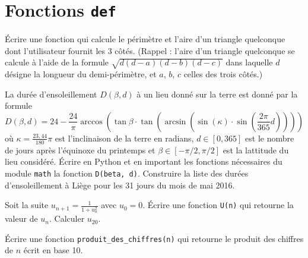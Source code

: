 \section{Fonctions \texttt{def}}

\begin{question}
Écrire une fonction qui calcule le périmètre et l'aire d’un triangle quelconque
dont l'utilisateur fournit les 3 côtés.
(Rappel : l'aire d’un triangle quelconque se calcule à l'aide de la formule
$\sqrt{d(d-a)(d-b)(d-c)}$ dans laquelle $d$ désigne la longueur du
demi-périmètre, et $a$, $b$, $c$ celles des trois côtés.)
\end{question}

\begin{exercice}
La durée d'ensoleillement $D(\beta, d)$ à un lieu donné sur la terre est donné par
la formule
\[
D(\beta,d) = 24 - \frac{24}{\pi}\arccos\left( \tan \beta \cdot
\tan\left(\arcsin\left(\sin(\kappa)\cdot \sin\left(\frac{2\pi}{365}d
\right)\right)\right)\right)
\]
où $\kappa=\frac{23,44}{180}\pi$ est l'inclinaison de la terre en radians,
$d\in[0,365]$ est le nombre de jours après l'équinoxe du printemps et
$\beta\in[-\pi/2,\pi/2]$ est la lattitude du lieu considéré.
Écrire en Python et en important les fonctions nécessaires du module
\texttt{math} la fonction \texttt{D(beta, d)}. Construire la liste des durées
d'ensoleillement à Liège pour les 31 jours du mois de mai 2016.
\end{exercice}

\begin{question}
Soit la suite $u_{n+1}= \frac{1}{1+u_n^2}$ avec $u_0=0$.
Écrire une fonction \texttt{U(n)} qui retourne la valeur de $u_n$. Calculer $u_{20}$.
\end{question}

\begin{question}
Écrire une fonction \texttt{produit\_des\_chiffres(n)} qui retourne le produit
des chiffres de $n$ écrit en base 10. 
\end{question}

